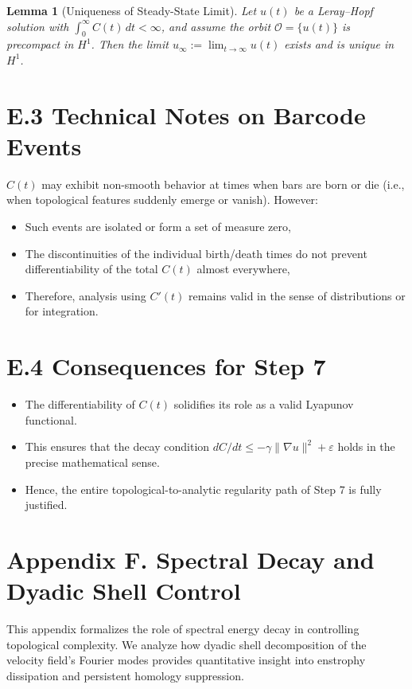 \documentclass[11pt]{article}
\newtheorem{lemma}[theorem]{Lemma}
\theoremstyle{definition}
\begin{document}
\begin{lemma}[Uniqueness of Steady-State Limit]
Let $u(t)$ be a Leray--Hopf solution with $\int_0^\infty C(t)\,dt < \infty$, and assume the orbit $\mathcal{O} = \{u(t)\}$ is precompact in $H^1$. Then the limit $u_\infty := \lim_{t \to \infty} u(t)$ exists and is unique in $H^1$.
\end{lemma}

\section*{E.3 Technical Notes on Barcode Events}
$C(t)$ may exhibit non-smooth behavior at times when bars are born or die (i.e., when topological features suddenly emerge or vanish). However:
\begin{itemize}
  \item Such events are isolated or form a set of measure zero,
  \item The discontinuities of the individual birth/death times do not prevent differentiability of the total $C(t)$ almost everywhere,
  \item Therefore, analysis using $C'(t)$ remains valid in the sense of distributions or for integration.
\end{itemize}

\section*{E.4 Consequences for Step 7}
\begin{itemize}
  \item The differentiability of $C(t)$ solidifies its role as a valid Lyapunov functional.
  \item This ensures that the decay condition $dC/dt \leq -\gamma \|\nabla u\|^2 + \varepsilon$ holds in the precise mathematical sense.
  \item Hence, the entire topological-to-analytic regularity path of Step 7 is fully justified.
\end{itemize}


\section*{Appendix F. Spectral Decay and Dyadic Shell Control}

This appendix formalizes the role of spectral energy decay in controlling topological complexity. We
analyze how dyadic shell decomposition of the velocity field’s Fourier modes provides quantitative
insight into enstrophy dissipation and persistent homology suppression.
\end{document}
